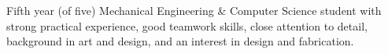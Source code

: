 
\begin{center}
	\begin{minipage}[t]{0.90\textwidth}
		Fifth year (of five) Mechanical Engineering \& Computer Science student with strong practical experience, good teamwork skills, close attention to detail, background in art and design, and an interest in design and fabrication.
	\end{minipage}
\end{center}